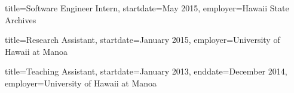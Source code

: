 \documentclass{resume}
\begin{document}
\begin{job}{title=Software Engineer Intern,
            startdate=May 2015,
            employer=Hawaii State Archives}
\end{job}

\begin{job}{title=Research Assistant,
            startdate=January 2015,
            employer=University of Hawaii at Manoa}
\end{job}

\begin{job}{title=Teaching Assistant,
            startdate=January 2013,
            enddate=December 2014,
            employer=University of Hawaii at Manoa}
\end{job}
\end{document}

